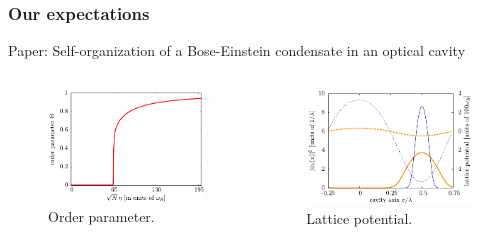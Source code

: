 \documentclass[pdflatex,compress]{beamer}
\begin{document}
\begin{frame}
\frametitle{Our expectations}
Paper: Self-organization of a Bose-Einstein condensate in an optical cavity \cite{Nagy2008}
\begin{columns}
\begin{figure}
\centering
\includegraphics[width=1\textwidth]{images/domokos_order_parameter.pdf}
\caption{Order parameter.}
\end{figure}
\begin{figure}
\centering
\includegraphics[width=1\textwidth]{images/domokos_lattice_potential.pdf}
\caption{Lattice potential.}
\end{figure}
\end{columns}
\end{frame}
\end{document}
